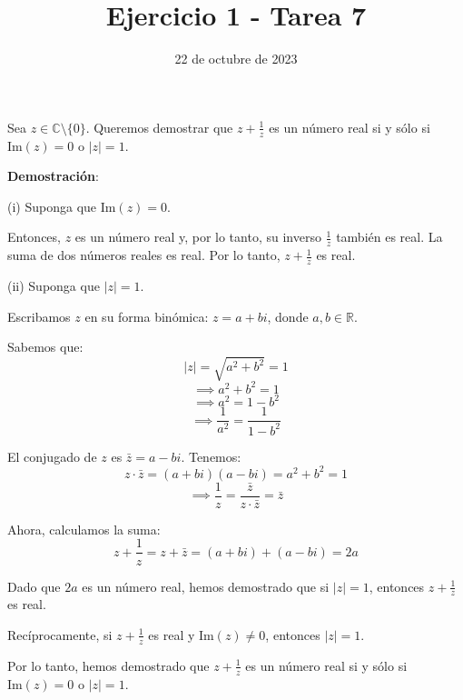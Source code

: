 \documentclass{article}
\title{Ejercicio 1 - Tarea 7}
\date{22 de octubre de 2023}
\begin{document}
\maketitle

Sea \( z \in \mathbb{C} \setminus \{0\} \). Queremos demostrar que \( z + \frac{1}{z} \) es un número real si y sólo si \( \text{Im}(z) = 0 \) o \( |z| = 1 \).

\textbf{Demostración}:

(i) Suponga que \( \text{Im}(z) = 0 \). 

Entonces, \( z \) es un número real y, por lo tanto, su inverso \( \frac{1}{z} \) también es real. La suma de dos números reales es real. Por lo tanto, \( z + \frac{1}{z} \) es real.

(ii) Suponga que \( |z| = 1 \).

Escribamos \( z \) en su forma binómica: \( z = a + bi \), donde \( a, b \in \mathbb{R} \). 

Sabemos que:
\[ |z| = \sqrt{a^2 + b^2} = 1 \]
\[ \implies a^2 + b^2 = 1 \]
\[ \implies a^2 = 1 - b^2 \]
\[ \implies \frac{1}{a^2} = \frac{1}{1 - b^2} \]

El conjugado de \( z \) es \( \bar{z} = a - bi \). Tenemos:
\[ z \cdot \bar{z} = (a + bi)(a - bi) = a^2 + b^2 = 1 \]
\[ \implies \frac{1}{z} = \frac{\bar{z}}{z \cdot \bar{z}} = \bar{z} \]

Ahora, calculamos la suma:
\[ z + \frac{1}{z} = z + \bar{z} = (a + bi) + (a - bi) = 2a \]

Dado que \( 2a \) es un número real, hemos demostrado que si \( |z| = 1 \), entonces \( z + \frac{1}{z} \) es real.

Recíprocamente, si \( z + \frac{1}{z} \) es real y \( \text{Im}(z) \neq 0 \), entonces \( |z| = 1 \).

Por lo tanto, hemos demostrado que \( z + \frac{1}{z} \) es un número real si y sólo si \( \text{Im}(z) = 0 \) o \( |z| = 1 \).
\end{document}
